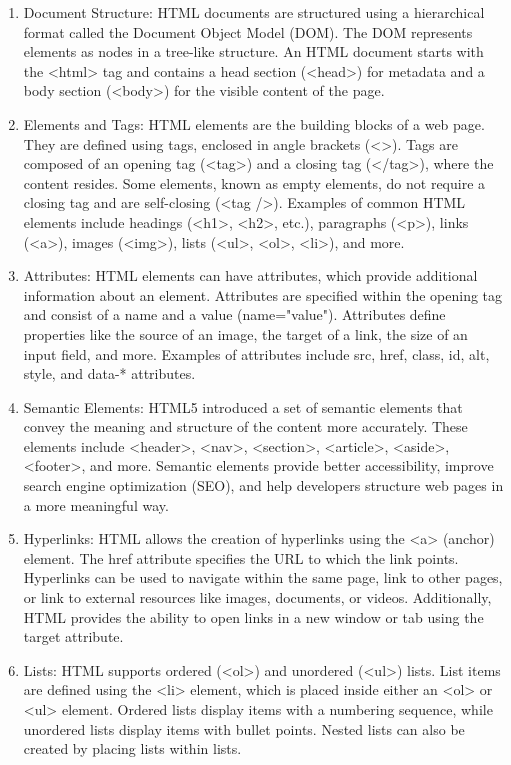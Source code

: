 \documentclass[12 pt, oneside]{book}
\begin{document}
\begin{enumerate}
\item  Document Structure: HTML documents are structured using a hierarchical format called the Document Object Model (DOM). The DOM represents elements as nodes in a tree-like structure. An HTML document starts with the <html> tag and contains a head section (<head>) for metadata and a body section (<body>) for the visible content of the page.

\item Elements and Tags: HTML elements are the building blocks of a web page. They are defined using tags, enclosed in angle brackets (<>). Tags are composed of an opening tag (<tag>) and a closing tag (</tag>), where the content resides. Some elements, known as empty elements, do not require a closing tag and are self-closing (<tag />). Examples of common HTML elements include headings (<h1>, <h2>, etc.), paragraphs (<p>), links (<a>), images (<img>), lists (<ul>, <ol>, <li>), and more.

\item Attributes: HTML elements can have attributes, which provide additional information about an element. Attributes are specified within the opening tag and consist of a name and a value (name="value"). Attributes define properties like the source of an image, the target of a link, the size of an input field, and more. Examples of attributes include src, href, class, id, alt, style, and data-* attributes.

\item Semantic Elements: HTML5 introduced a set of semantic elements that convey the meaning and structure of the content more accurately. These elements include <header>, <nav>, <section>, <article>, <aside>, <footer>, and more. Semantic elements provide better accessibility, improve search engine optimization (SEO), and help developers structure web pages in a more meaningful way.

\item Hyperlinks: HTML allows the creation of hyperlinks using the <a> (anchor) element. The href attribute specifies the URL to which the link points. Hyperlinks can be used to navigate within the same page, link to other pages, or link to external resources like images, documents, or videos. Additionally, HTML provides the ability to open links in a new window or tab using the target attribute.

\item Lists: HTML supports ordered (<ol>) and unordered (<ul>) lists. List items are defined using the <li> element, which is placed inside either an <ol> or <ul> element. Ordered lists display items with a numbering sequence, while unordered lists display items with bullet points. Nested lists can also be created by placing lists within lists.


\end{enumerate}
\end{document}
